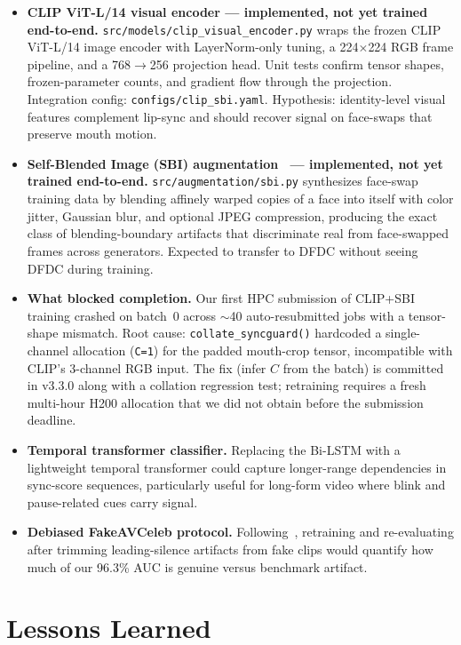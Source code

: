 \documentclass[12pt, letterpaper]{article}
\begin{document}
\begin{itemize}[leftmargin=1.5em, itemsep=4pt]
    \item \textbf{CLIP ViT-L/14 visual encoder --- implemented, not yet trained end-to-end.} \texttt{src/models/clip\_visual\_encoder.py} wraps the frozen CLIP ViT-L/14 image encoder with LayerNorm-only tuning, a 224$\times$224 RGB frame pipeline, and a 768$\to$256 projection head. Unit tests confirm tensor shapes, frozen-parameter counts, and gradient flow through the projection. Integration config: \texttt{configs/clip\_sbi.yaml}. Hypothesis: identity-level visual features complement lip-sync and should recover signal on face-swaps that preserve mouth motion.
    \item \textbf{Self-Blended Image (SBI) augmentation~\cite{shiohara2022} --- implemented, not yet trained end-to-end.} \texttt{src/augmentation/sbi.py} synthesizes face-swap training data by blending affinely warped copies of a face into itself with color jitter, Gaussian blur, and optional JPEG compression, producing the exact class of blending-boundary artifacts that discriminate real from face-swapped frames across generators. Expected to transfer to DFDC without seeing DFDC during training.
    \item \textbf{What blocked completion.} Our first HPC submission of CLIP+SBI training crashed on batch~0 across $\sim$40 auto-resubmitted jobs with a tensor-shape mismatch. Root cause: \texttt{collate\_syncguard()} hardcoded a single-channel allocation (\texttt{C=1}) for the padded mouth-crop tensor, incompatible with CLIP's 3-channel RGB input. The fix (infer $C$ from the batch) is committed in v3.3.0 along with a collation regression test; retraining requires a fresh multi-hour H200 allocation that we did not obtain before the submission deadline.
    \item \textbf{Temporal transformer classifier.} Replacing the Bi-LSTM with a lightweight temporal transformer could capture longer-range dependencies in sync-score sequences, particularly useful for long-form video where blink and pause-related cues carry signal.
    \item \textbf{Debiased FakeAVCeleb protocol.} Following~\cite{smeu2025}, retraining and re-evaluating after trimming leading-silence artifacts from fake clips would quantify how much of our 96.3\% AUC is genuine versus benchmark artifact.
\end{itemize}

\section{Lessons Learned}
\end{document}
